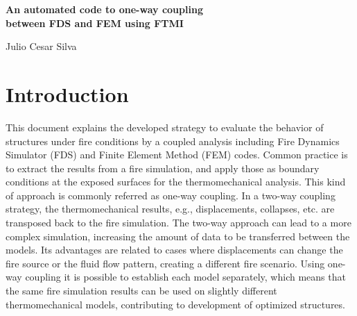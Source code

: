 \documentclass[11pt]{book}
\newcommand{\fdsversion}{6.11.0}
\begin{document}
\pagestyle{empty}

\begin{minipage}[t][9in][s]{6.5in}

\begin{flushright}
\fontsize{20}{24}\selectfont
\bf{
An automated code to one-way coupling \\
between FDS and FEM using FTMI \\
}
\end{flushright}
\begin{flushright}
\fontsize{14}{16}\selectfont
{
Julio Cesar Silva  
}

\end{flushright}

\headerC{
\today \\
FDS Version \fdsversion \\
Revision: 

}

\end{minipage}

\newpage

\newpage

\frontmatter

\pagestyle{plain}

\cleardoublepage
{}
\tableofcontents

\mainmatter


\chapter{Introduction}
\label{info:intro}

This document explains the developed strategy to evaluate the behavior of structures under fire conditions by a coupled analysis including Fire Dynamics Simulator (FDS\cite{FDS_Users_Guide}) and Finite Element Method (FEM) codes. Common practice is to extract the results from a fire simulation, and apply those as boundary conditions at the exposed surfaces for the thermomechanical analysis. This kind of approach is commonly referred as one-way coupling. In a two-way coupling strategy, the thermomechanical results, e.g., displacements, collapses, etc. are transposed back to the fire simulation. The two-way approach can lead to a more complex simulation, increasing the amount of data to be transferred between the models. Its advantages are related to cases where displacements can change the fire source or the fluid flow pattern, creating a different fire scenario. Using one-way coupling it is possible to establish each model separately, which means that the same fire simulation results can be used on slightly different thermomechanical models, contributing to development of optimized structures.  
\end{document}
